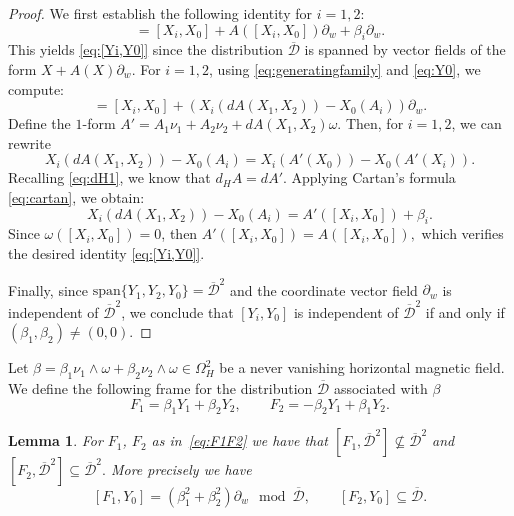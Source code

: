 \documentclass{amsart}
\theoremstyle{plain}
\newtheorem{lemma}[theorem]{Lemma}
\theoremstyle{definition}
\theoremstyle{remark}
\newcommand{\diff}{d}%
\newcommand{\p}{\partial}												%
\newcommand{\distr}{\mathcal{D}}								%
\newcommand{\B}{\beta}
\newcommand{\lift}[1]{\overline{#1}} 							%
\newcommand{\mg}{\B_1\nu_1\wedge \omega
										+\B_2\nu_2\wedge \omega}	%
\begin{document}
\begin{proof}
We first establish the following identity for $i=1,2$:
\begin{equation}
[Y_i,Y_0]=[X_i,X_0]+A([X_i,X_0])\p_w+\B_i\p_w.
\end{equation}
This yields \eqref{eq:[Yi,Y0]} since the distribution $\lift \distr$ is spanned by vector fields of the form $X + A(X) \partial_w$.
For $i=1,2$, using \eqref{eq:generatingfamily} and \eqref{eq:Y0}, we compute:
\begin{equation}
[Y_i,Y_0] = [X_i,X_0] + (X_i(\diff A(X_1,X_2)) - X_0(A_i)) \p_w.
\end{equation}
Define the $1$-form
$A' = A_1\nu_1 + A_2\nu_2 + \diff A(X_1,X_2) \omega$.
Then, for $i=1,2$, we can rewrite
\begin{equation}
X_i(\diff A(X_1,X_2)) - X_0(A_i) = X_i(A'(X_0)) - X_0(A'(X_i)).
\end{equation}
Recalling \eqref{eq:dH1}, we know that $\diff_H A = \diff A'$. Applying Cartan's formula \eqref{eq:cartan}, we obtain:
\begin{equation}
X_i(\diff A(X_1,X_2)) - X_0(A_i) = A'([X_i,X_0]) + \B_i.
\end{equation}
Since $\omega([X_i,X_0]) = 0$, then
$A'([X_i,X_0]) = A([X_i,X_0]),$
which verifies the desired identity \eqref{eq:[Yi,Y0]}.

Finally, since $\mathrm{span}\{Y_1,Y_2,Y_0\}=\lift \distr^{2}$ and the coordinate vector field $\p_w$ is independent of $\lift \distr^{2}$, we conclude that $[Y_i,Y_0]$ is independent of $\lift \distr^{2}$ if and only if $(\B_1,\B_2) \neq (0,0)$.
\end{proof}



Let $\B=\mg\in \Omega^2_H$ be a never vanishing horizontal magnetic field. We define the following frame for the distribution $\lift\distr$ associated with $\beta$
\begin{equation}\label{eq:F1F2}
F_1=\B_1Y_1+\B_2Y_2,  \qquad
F_2=-\B_2Y_1+\B_1Y_2.
\end{equation}



\begin{lemma}
For $F_1$, $F_2$ as in~\eqref{eq:F1F2} we have  that $[F_1,\lift\distr^2]\not\subseteq \lift\distr^2$  and $[F_2,\lift\distr^2]\subseteq \lift\distr^2.$
More precisely we have 
\begin{equation}
\label{eq:[F_1,Y_0]}
[F_1,Y_0]=\left(\B_1^2+\B_2^2\right)\p_w\mod \lift\distr,
\qquad [F_2,Y_0]\subseteq  \lift \distr.
\end{equation}
\end{lemma}
\end{document}
